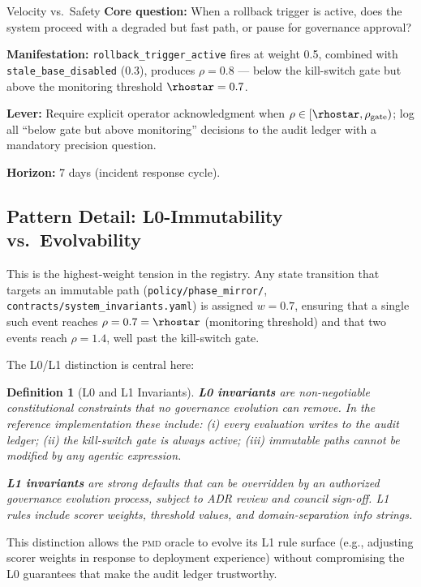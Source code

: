 \documentclass[11pt,letterpaper]{article}
\newtheorem{definition}[theorem]{Definition}
\theoremstyle{remark}
\newcommand{\pmd}{\textsc{pmd}}
\newcommand{\rhogate}{\rho_{\mathrm{gate}}}
\newcommand{\rhosys}{\rho}
\begin{document}
\begin{tensionbox}{Velocity vs.\ Safety}
\textbf{Core question:} When a rollback trigger is active, does the system
proceed with a degraded but fast path, or pause for governance approval?

\textbf{Manifestation:} \texttt{rollback\_trigger\_active} fires at weight
0.5, combined with \texttt{stale\_base\_disabled} (0.3), produces
$\rhosys = 0.8$ --- below the kill-switch gate but above the monitoring
threshold $\rhostar = 0.7$.

\textbf{Lever:} Require explicit operator acknowledgment when
$\rhosys \in [\rhostar, \rhogate)$; log all ``below gate but above
monitoring'' decisions to the audit ledger with a mandatory precision
question.

\textbf{Horizon:} 7 days (incident response cycle).
\end{tensionbox}

\subsection{Pattern Detail: L0-Immutability vs.\ Evolvability}

This is the highest-weight tension in the registry.  Any state transition
that targets an immutable path (\texttt{policy/phase\_mirror/},
\texttt{contracts/system\_invariants.yaml}) is assigned $w = 0.7$,
ensuring that a single such event reaches $\rhosys = 0.7 = \rhostar$
(monitoring threshold) and that two events reach $\rhosys = 1.4$,
well past the kill-switch gate.

The L0/L1 distinction is central here:

\begin{definition}[L0 and L1 Invariants]
\label{def:l0l1}
\textbf{L0 invariants} are non-negotiable constitutional constraints
that no governance evolution can remove.  In the reference implementation
these include: (i) every evaluation writes to the audit ledger; (ii) the
kill-switch gate is always active; (iii) immutable paths cannot be
modified by any agentic expression.

\textbf{L1 invariants} are strong defaults that can be overridden by
an authorized governance evolution process, subject to ADR review
and council sign-off.  L1 rules include scorer weights, threshold
values, and domain-separation info strings.
\end{definition}

This distinction allows the \pmd{} oracle to evolve its L1 rule surface
(e.g., adjusting scorer weights in response to deployment experience)
without compromising the L0 guarantees that make the audit ledger
trustworthy.
\end{document}
